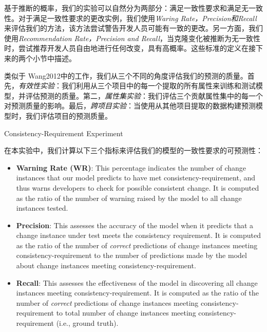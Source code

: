{基于推断的概率，我们的实验可以自然分为两部分：满足一致性要求和满足无一致性。对于满足一致性要求的更改实例，我们使用{\em Waring Rate，Precision和Recall}来评估我们的方法，该方法尝试警告开发人员可能有一致的更改。另一方面，我们使用{\em Recommendation Rate，Precision and Recall}，当克隆变化被推断为无一致性时，尝试推荐开发人员自由地进行任何改变，具有高概率。这些标准的定义在接下来的两个小节中描述。

类似于\cite{} {Wang2012}中的工作，我们从三个不同的角度评估我们的预测的质量。首先，{\em 有效性实验}：我们利用从三个项目中的每一个提取的所有属性来训练和测试模型，并评估预测的质量。第二，{\em 属性集实验}：我们评估三个贡献属性集中的每一个对预测质量的影响。最后，{\em 跨项目实验}：当使用从其他项目提取的数据构建预测模型时，我们评估项目的预测质量。


{Consistency-Requirement Experiment}

在本实验中，我们计算以下三个指标来评估我们的模型的一致性要求的可预测性：
\begin{itemize}
\item \textbf{Warning Rate (WR)}: 
This percentage indicates the number of change instances that our model predicts to have met consistency-requirement, and thus warns developers to check for possible consistent change.
It is computed as the ratio of the number of warning raised by the model to all change instances tested. 

\item \textbf{Precision}: 
This assesses the accuracy of the model when it predicts that a change instance under test meets the consistency requirement. 
It is computed as the ratio of the number of {\em correct} predictions of change instances meeting consistency-requirement to the number of predictions made by the model about change instances meeting consistency-requirement.

\item \textbf{Recall}: 
This assesses the effectiveness of the model in discovering all change instances meeting consistency-requirement.
It is computed as the ratio of the number of {\em correct} predictions of change instances meeting consistency-requirement to total number of change instances meeting consistency-requirement (i.e., ground truth).
\end{itemize}

}

